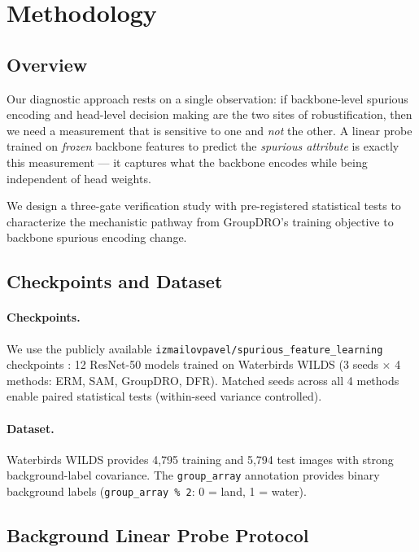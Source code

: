 \section{Methodology}
\label{sec:methodology}

\subsection{Overview}

Our diagnostic approach rests on a single observation: if backbone-level spurious encoding and head-level decision making are the two sites of robustification, then we need a measurement that is sensitive to one and \emph{not} the other. A linear probe trained on \emph{frozen} backbone features to predict the \emph{spurious attribute} is exactly this measurement --- it captures what the backbone encodes while being independent of head weights.

We design a three-gate verification study with pre-registered statistical tests to characterize the mechanistic pathway from GroupDRO's training objective to backbone spurious encoding change.

\subsection{Checkpoints and Dataset}

\paragraph{Checkpoints.} We use the publicly available \texttt{izmailovpavel/spurious\_feature\_learning} checkpoints \cite{izmailov2022feature}: 12 ResNet-50 models trained on Waterbirds WILDS (3 seeds $\times$ 4 methods: ERM, SAM, GroupDRO, DFR). Matched seeds across all 4 methods enable paired statistical tests (within-seed variance controlled).

\paragraph{Dataset.} Waterbirds WILDS \cite{sagawa2019distributionally,koh2021wilds} provides 4,795 training and 5,794 test images with strong background-label covariance. The \texttt{group\_array} annotation provides binary background labels (\texttt{group\_array \% 2}: 0 = land, 1 = water).

\subsection{Background Linear Probe Protocol}

